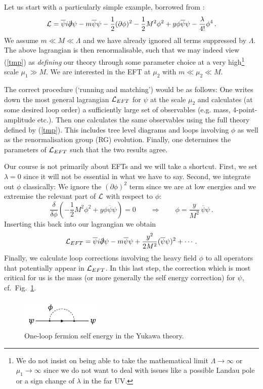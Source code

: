 \documentclass[12pt]{article}
\newcommand{\be}{\begin{equation}}
\newcommand{\ee}{\end{equation}}
\newcommand{\ol}{\overline}
\numberwithin{equation}{section}
\begin{document}
Let us start with a particularly simple example, borrowed from \cite{Luty:2005sn}:
\be
{\cal L}=\ol{\psi}i\slashed{\partial}\psi-m\ol{\psi}\psi-\frac{1}{2}(\partial \phi)^2 -\frac{1}{2}M^2\phi^2+y\phi\ol{\psi}\psi-\frac{\lambda}{4!}\phi^4\,.
\label{tmp}
\ee
We assume $m\ll M\ll \Lambda$ and we have already ignored all terms suppressed by $\Lambda$. The above lagrangian is then renormalisable, such that we may indeed view (\ref{tmp}) as {\it defining} our theory through some parameter choice at a very high\footnote{
We 
do not insist on being able to take the mathematical limit $\Lambda\to \infty$ or $\mu_1\to \infty$ since we do not want to deal with issues like a possible Landau pole or a sign change of $\lambda$ in the far UV.
} 
scale $\mu_1\gg M$. We are interested in the EFT at $\mu_2$ with $m\ll \mu_2\ll M$.

The correct procedure (`running and matching')  would be as follows: One writes down the most general lagrangian ${\cal L}_{EFT}$ for $\psi$ at the scale $\mu_2$ and calculates (at some desired loop order) a sufficiently large set of observables (e.g. mass, 4-point-amplitude etc.). Then one calculates the same observables using the full theory defined by (\ref{tmp}). This includes tree level diagrams and loops involving $\phi$ as well as the renormalisation group (RG) evolution. Finally, one determines the parameters of ${\cal L}_{EFT}$ such that the two results agree.

Our course is not primarily about EFTs and we will take a shortcut. First, we set $\lambda=0$ since it will not be essential in what we have to say. Second, we integrate out $\phi$ classically: We ignore the $(\partial\phi)^2$ term since we are at low energies and we extremise the relevant part of ${\cal L}$ with respect to $\phi$:
\be
\frac{\delta}{\delta\phi}\left(-\frac{1}{2}M^2\phi^2+y\phi\ol{\psi}\psi
\right)=0\qquad\Rightarrow\qquad \phi=\frac{y}{M^2}\,\ol{\psi}\psi\,.
\ee
Inserting this back into our lagrangian we obtain
\be
{\cal L}_{EFT}=\ol{\psi}i\slashed{\partial}\psi-m\ol{\psi}\psi+\frac{y^2}{2M^2} (\ol{\psi}\psi)^2+\cdots\,.\label{left}
\ee
Finally, we calculate loop corrections involving the heavy field $\phi$ to all operators that potentially appear in ${\cal L}_{EFT}$. In this last step, the correction which is most critical for us is the mass (or more generally the self energy correction) for $\psi$, cf.~Fig.~\ref{sep}.

\begin{figure}[ht]
\begin{center} 
\includegraphics[width=4cm]{sep.png}
\caption{One-loop fermion self energy in the Yukawa theory.}
\label{sep} 
\end{center}
\end{figure}
\end{document}
